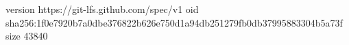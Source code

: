 version https://git-lfs.github.com/spec/v1
oid sha256:1f0e7920b7a0dbe376822b626e750d1a94db251279fb0db37995883304b5a73f
size 43840
